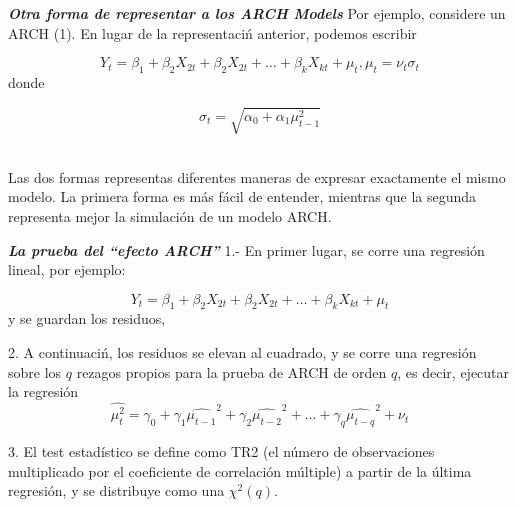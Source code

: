 
\textit{\textbf{Otra forma de representar a los ARCH Models}}
	Por ejemplo, considere un ARCH (1). En lugar de la representaci\'n anterior, podemos escribir 
	
	\begin{equation}
	Y_t = \beta_1 + \beta_2 X_{2t} + \beta_2 X_{2t} + \dots{} + \beta_k X_{kt} +\mu_t, \mu_t =\nu_t \sigma_t
	\end{equation}
	\vspace{2mm}	
	donde 
	
	\begin{equation}
	\sigma_t = \sqrt{\alpha_0 + \alpha_1 \mu^2_{t-1}}
	\end{equation} 
	
	Las dos formas representas diferentes maneras de expresar exactamente el mismo modelo. La primera forma es m\'as f\'acil de entender, mientras que la segunda representa mejor la simulaci\'on de un modelo ARCH.
	

\textit{\textbf{La prueba del \textquotedblleft efecto ARCH\textquotedblright}}
	1.- En primer lugar, se corre una regresi\'on lineal, por ejemplo:
	
	\begin{equation}
	Y_t = \beta_1 + \beta_2 X_{2t} + \beta_2 X_{2t} + \dots{} + \beta_k X_{kt} +\mu_t
	\end{equation}
	y se guardan los residuos,
	
	2. A continuaci\'n, los residuos se elevan al cuadrado, y se corre una regresi\'on sobre los $q$ rezagos propios para la prueba de ARCH de orden $q$, es decir, ejecutar la regresión
	\begin{equation}
	\hat{\mu_t^2} = \gamma_0 + \gamma_1 \hat{\mu_{t-1}}^2+ \gamma_2 \hat{\mu_{t-2}}^2+\dots{} +\gamma_{q} \hat{\mu_{t-q}}^2+ \nu_t
	\end{equation}
	
	3. El test estad\'{i}stico se define como TR2 (el n\'umero de observaciones multiplicado por el coeficiente de correlaci\'on m\'ultiple) a partir de la \'ultima regresi\'on, y se distribuye como una  $\chi^2(q)$.
	
